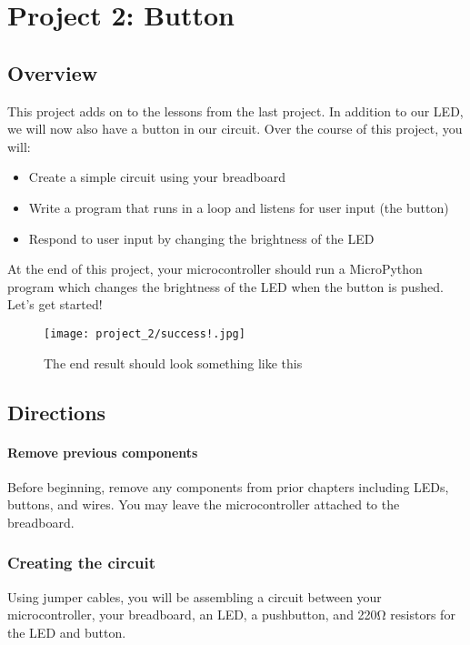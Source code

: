 \chapter{Project 2: Button}

\section{Overview}
This project adds on to the lessons from the last project. In addition to our LED, we will now also have
a button in our circuit. Over the course of this project, you will:
\begin{itemize}
    \item Create a simple circuit using your breadboard
    \item Write a program that runs in a loop and listens for user input (the button)
    \item Respond to user input by changing the brightness of the LED
\end{itemize}
At the end of this project, your microcontroller should run a MicroPython program which changes the
brightness of the LED when the button is pushed. Let's get started!
\begin{figure}[H]
\centering
    \texttt{[image: project\_2/success!.jpg]}
    \caption{The end result should look something like this}
\end{figure}

\pagebreak

\section{Directions}

\subsubsection{Remove previous components}
Before beginning, remove any components from prior chapters including LEDs, buttons, and wires. You may leave the
microcontroller attached to the breadboard.

\subsection{Creating the circuit}
Using jumper cables, you will be assembling a circuit between your microcontroller, your breadboard,
an LED, a pushbutton, and 220\si{\ohm} resistors for the LED and button.

